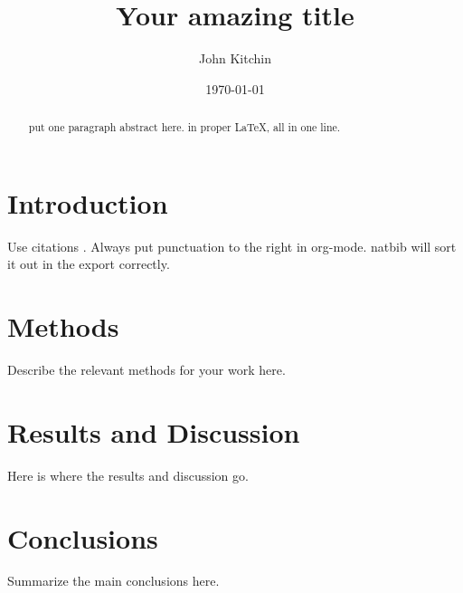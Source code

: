 \documentclass[aps,prb,citeautoscript,preprint,citeautoscript,showkeys]{revtex4-1}
\begin{document}
\title{Your amazing title}
\author{John Kitchin}

\date{\today}
\begin{abstract}
put one paragraph abstract here. in proper \LaTeX{}, all in one line.
\end{abstract}

\maketitle



\section{Introduction}
\label{sec-1}
Use citations \cite{chretien-density-2006}. Always put punctuation to the right in org-mode. natbib will sort it out in the export correctly.
\section{Methods}
\label{sec-2}
Describe the relevant methods for your work here.
\section{Results and Discussion}
\label{sec-3}
Here is where the results and discussion go.
\section{Conclusions}
\label{sec-4}

Summarize the main conclusions here.



\end{document}
